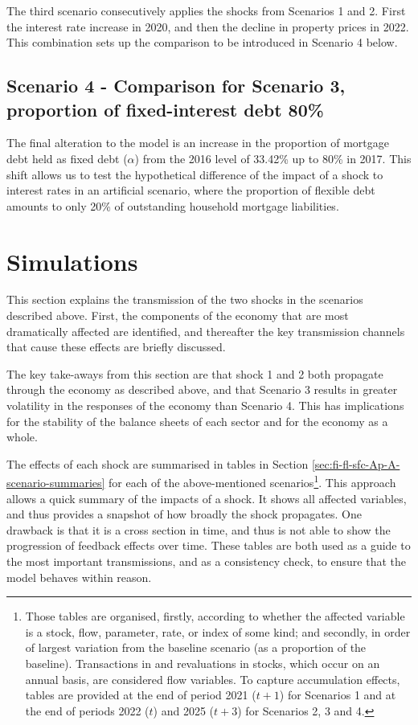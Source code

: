 \documentclass[
]{book}
\begin{document}
The third scenario consecutively applies the shocks from Scenarios 1 and 2. First the interest rate increase in 2020, and then the decline in property prices in 2022. This combination sets up the comparison to be introduced in Scenario 4 below.

\hypertarget{sec:fi-fl-sfc-scenarios-s4}{%
\subsection{Scenario 4 - Comparison for Scenario 3, proportion of fixed-interest debt 80\%}\label{sec:fi-fl-sfc-scenarios-s4}}

The final alteration to the model is an increase in the proportion of mortgage debt held as fixed debt (\(\alpha\)) from the 2016 level of 33.42\% up to 80\% in 2017. This shift allows us to test the hypothetical difference of the impact of a shock to interest rates in an artificial scenario, where the proportion of flexible debt amounts to only 20\% of outstanding household mortgage liabilities.

\hypertarget{sec:fi-fl-sfc-simulations}{%
\section{Simulations}\label{sec:fi-fl-sfc-simulations}}

This section explains the transmission of the two shocks in the scenarios described above. First, the components of the economy that are most dramatically affected are identified, and thereafter the key transmission channels that cause these effects are briefly discussed.

The key take-aways from this section are that shock 1 and 2 both propagate through the economy as described above, and that Scenario 3 results in greater volatility in the responses of the economy than Scenario 4. This has implications for the stability of the balance sheets of each sector and for the economy as a whole.

The effects of each shock are summarised in tables in Section \ref{sec:fi-fl-sfc-Ap-A-scenario-summaries} for each of the above-mentioned scenarios\footnote{Those tables are organised, firstly, according to whether the affected variable is a stock, flow, parameter, rate, or index of some kind; and secondly, in order of largest variation from the baseline scenario (as a proportion of the baseline). Transactions in and revaluations in stocks, which occur on an annual basis, are considered flow variables. To capture accumulation effects, tables are provided at the end of period 2021 (\(t+1\)) for Scenarios 1 and at the end of periods 2022 (\(t\)) and 2025 (\(t+3\)) for Scenarios 2, 3 and 4.}. This approach allows a quick summary of the impacts of a shock. It shows all affected variables, and thus provides a snapshot of how broadly the shock propagates. One drawback is that it is a cross section in time, and thus is not able to show the progression of feedback effects over time. These tables are both used as a guide to the most important transmissions, and as a consistency check, to ensure that the model behaves within reason.
\end{document}
